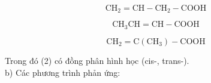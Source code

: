 \documentclass[10pt]{article}
\begin{document}
\begin{equation*}
\mathrm{CH}_{2}=\mathrm{CH}-\mathrm{CH}_{2}-\mathrm{COOH} \tag{1}
\end{equation*}



\begin{equation*}
\mathrm{CH}_{3} \mathrm{CH}=\mathrm{CH}-\mathrm{COOH} \tag{2}
\end{equation*}



\begin{equation*}
\mathrm{CH}_{2}=\mathrm{C}\left(\mathrm{CH}_{3}\right)-\mathrm{COOH} \tag{3}
\end{equation*}


Trong đó (2) có đồng phân hình học (cis-, trans-).\\
b) Các phương trình phản ứng:
\end{document}
